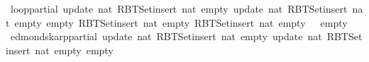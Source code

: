 \begin{isabellebody}
\ {\isachardoublequoteopen}loop{\isacharprime}{\kern0pt}{\isacharunderscore}{\kern0pt}partial\ {\isacharparenleft}{\kern0pt}update\ {\isacharparenleft}{\kern0pt}{}{\isacharcolon}{\kern0pt}{\isacharcolon}{\kern0pt}nat{\isacharparenright}{\kern0pt}\ {\isacharparenleft}{\kern0pt}RBT{\isacharunderscore}{\kern0pt}Set{\isachardot}{\kern0pt}insert\ {\isacharparenleft}{\kern0pt}{}{\isacharcolon}{\kern0pt}{\isacharcolon}{\kern0pt}nat{\isacharparenright}{\kern0pt}\ empty{\isacharparenright}{\kern0pt}\ {\isacharparenleft}{\kern0pt}update\ {\isacharparenleft}{\kern0pt}{}{\isacharcolon}{\kern0pt}{\isacharcolon}{\kern0pt}nat{\isacharparenright}{\kern0pt}\ {\isacharparenleft}{\kern0pt}RBT{\isacharunderscore}{\kern0pt}Set{\isachardot}{\kern0pt}insert\ {\isacharparenleft}{\kern0pt}{}{\isacharcolon}{\kern0pt}{\isacharcolon}{\kern0pt}nat{\isacharparenright}{\kern0pt}\ empty{\isacharparenright}{\kern0pt}\ empty{\isacharparenright}{\kern0pt}{\isacharparenright}{\kern0pt}\ {\isacharparenleft}{\kern0pt}RBT{\isacharunderscore}{\kern0pt}Set{\isachardot}{\kern0pt}insert\ {\isacharparenleft}{\kern0pt}{}{\isacharcolon}{\kern0pt}{\isacharcolon}{\kern0pt}nat{\isacharparenright}{\kern0pt}\ empty{\isacharparenright}{\kern0pt}\ {\isacharparenleft}{\kern0pt}RBT{\isacharunderscore}{\kern0pt}Set{\isachardot}{\kern0pt}insert\ {\isacharparenleft}{\kern0pt}{}{\isacharcolon}{\kern0pt}{\isacharcolon}{\kern0pt}nat{\isacharparenright}{\kern0pt}\ empty{\isacharparenright}{\kern0pt}\ {}\ {}\ empty{\isachardoublequoteclose}\isanewline
{}\isamarkupfalse%
\ {\isachardoublequoteopen}edmonds{\isacharunderscore}{\kern0pt}karp{\isacharunderscore}{\kern0pt}partial\ {\isacharparenleft}{\kern0pt}update\ {\isacharparenleft}{\kern0pt}{}{\isacharcolon}{\kern0pt}{\isacharcolon}{\kern0pt}nat{\isacharparenright}{\kern0pt}\ {\isacharparenleft}{\kern0pt}RBT{\isacharunderscore}{\kern0pt}Set{\isachardot}{\kern0pt}insert\ {\isacharparenleft}{\kern0pt}{}{\isacharcolon}{\kern0pt}{\isacharcolon}{\kern0pt}nat{\isacharparenright}{\kern0pt}\ empty{\isacharparenright}{\kern0pt}\ {\isacharparenleft}{\kern0pt}update\ {\isacharparenleft}{\kern0pt}{}{\isacharcolon}{\kern0pt}{\isacharcolon}{\kern0pt}nat{\isacharparenright}{\kern0pt}\ {\isacharparenleft}{\kern0pt}RBT{\isacharunderscore}{\kern0pt}Set{\isachardot}{\kern0pt}insert\ {\isacharparenleft}{\kern0pt}{}{\isacharcolon}{\kern0pt}{\isacharcolon}{\kern0pt}nat{\isacharparenright}{\kern0pt}\ empty{\isacharparenright}{\kern0pt}\ empty{\isacharparenright}{\kern0pt}{\isacharparenright}{\kern0pt}{\isachardoublequoteclose}%

\end{isabellebody}
